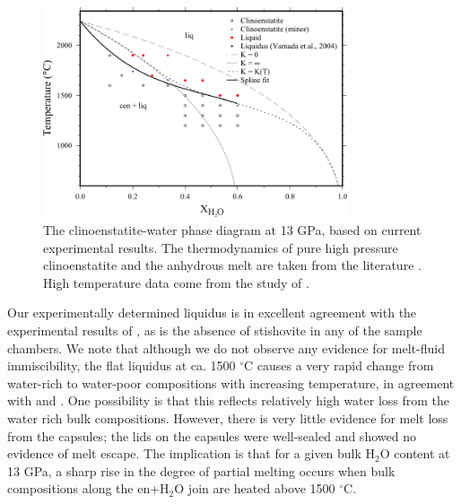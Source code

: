 \documentclass[review]{elsarticle}
\begin{document}
\begin{figure}[ht!]
  \centering
      \includegraphics[width=0.8\textwidth]{figures/enstatite_edited}
  \caption{The clinoenstatite-water phase diagram at 13 GPa, based on current experimental results. The thermodynamics of pure high pressure clinoenstatite and the anhydrous melt are taken from the literature \citep{SLB2011, DKS2013}. High temperature data come from the study of \cite{NDMPMF2016}.}
  \label{fig:eoH}
\end{figure}

Our experimentally determined liquidus is in excellent agreement with the experimental results of \cite{YII2004}, as is the absence of stishovite in any of the sample chambers. We note that although we do not observe any evidence for melt-fluid immiscibility, the flat liquidus at ca. 1500 $^{\circ}$C causes a very rapid change from water-rich to water-poor compositions with increasing temperature, in agreement with \cite{Inoue1994} and \cite{YII2004}. One possibility is that this reflects relatively high water loss from the water rich bulk compositions. However, there is very little evidence for melt loss from the capsules; the lids on the capsules were well-sealed and showed no evidence of melt escape. The implication is that for a given bulk H$_2$O content at 13 GPa, a sharp rise in the degree of partial melting occurs when bulk compositions along the en+H$_2$O join are heated above 1500 $^{\circ}$C.

\clearpage
\end{document}
